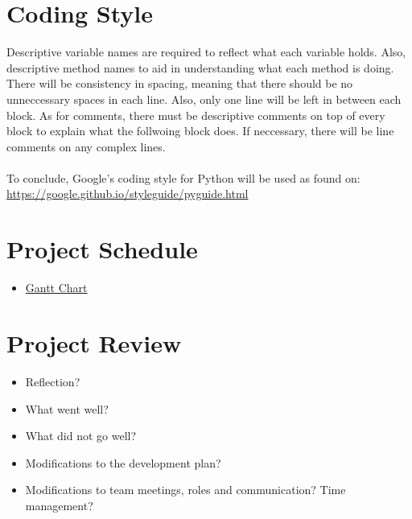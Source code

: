 \documentclass{article}
\begin{document}
\section{Coding Style}
Descriptive variable names are required to reflect what each variable holds. Also, descriptive method names to aid in understanding what each method is doing. There will be consistency in spacing, meaning that there should be no unneccessary spaces in each line. Also, only one line will be left in between each block. As for comments, there must be descriptive comments on top of every block to explain what the follwoing block does. If neccessary, there will be line comments on any complex lines.\\
\\
To conclude, Google's coding style for Python will be used as found on: \url{https://google.github.io/styleguide/pyguide.html}

\section{Project Schedule}

\begin{itemize}

\item \href{run:GanttChart.gan} {Gantt Chart}\\

\end{itemize}
\section{Project Review}
\begin{itemize}
\item Reflection?
\item What went well?
\item  What did not go well?
\item Modifications to the development plan?
\item Modifications to team meetings, roles and communication? Time management?
\end{itemize}
\end{document}
